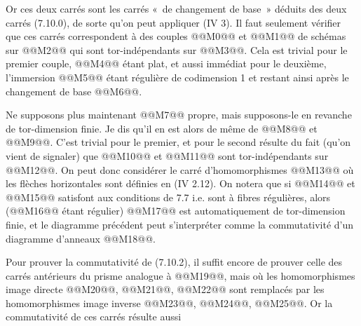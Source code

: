 

Or ces
deux carrés sont les carrés «~de changement de base~» déduits des deux carrés (7.10.0), de sorte qu'on peut appliquer (IV 3). Il faut seulement vérifier que ces carrés correspondent à des couples @@M0@@ et @@M1@@ de schémas sur @@M2@@ qui sont tor-indépendants sur @@M3@@. Cela est trivial pour le premier couple, @@M4@@ étant plat, et aussi immédiat pour le deuxième, l'immersion @@M5@@ étant régulière de codimension 1 et restant ainsi après le changement de base @@M6@@.

Ne supposons plus maintenant @@M7@@ propre, mais supposons-le en revanche de tor-dimension finie. Je dis qu'il en est alors de même de @@M8@@ et @@M9@@. C'est trivial pour le premier, et pour le second résulte du fait (qu'on vient de signaler) que @@M10@@ et @@M11@@ sont tor-indépendants sur @@M12@@. On peut donc considérer le carré d'homomorphismes
@@M13@@
où les flèches horizontales sont définies en (IV 2.12). On notera que si @@M14@@ et @@M15@@ satisfont aux conditions de 7.7 i.e. sont à fibres régulières, alors (@@M16@@ étant régulier) @@M17@@ est automatiquement de tor-dimension finie, et le diagramme précédent peut s'interpréter comme la commutativité d'un diagramme d'anneaux @@M18@@.

Pour prouver la commutativité de (7.10.2), il suffit encore de prouver celle des carrés antérieurs du prisme analogue à @@M19@@, mais où les homomorphismes image directe @@M20@@, @@M21@@, @@M22@@ sont remplacés par les homomorphismes image inverse @@M23@@, @@M24@@, @@M25@@. Or la commutativité de ces carrés résulte aussi%
